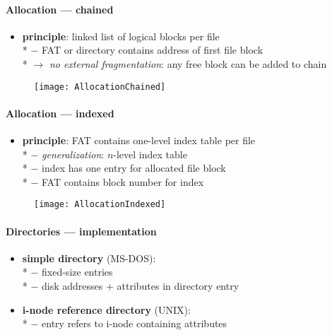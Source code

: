 \paragraph{Allocation --- chained}
\begin{itemize}
  \item \textbf{principle}: linked list of logical blocks per file \\*
    $ - $ FAT or directory contains address of first file block \\*
    $ \to $ \emph{no external fragmentation}: any free block can be added to chain
\end{itemize}
\begin{figure}[h]\centering\label{AllocationChained}\texttt{[image: AllocationChained]}\end{figure}

\paragraph{Allocation --- indexed}
\begin{itemize}
  \item \textbf{principle}: FAT contains one-level index table per file \\*
    $ - $ \emph{generalization}: $ n $-level index table \\*
    $ - $ index has one entry for allocated file block \\*
    $ - $ FAT contains block number for index
\end{itemize}
\begin{figure}[h]\centering\label{AllocationIndexed}\texttt{[image: AllocationIndexed]}\end{figure}

\paragraph{Directories --- implementation}
\begin{itemize}
  \item \textbf{simple directory} (MS-DOS): \\*
    $ - $ fixed-size entries \\*
    $ - $ disk addresses + attributes in directory entry
  \item \textbf{i-node reference directory} (UNIX): \\*
    $ - $ entry refers to i-node containing attributes
\end{itemize}


